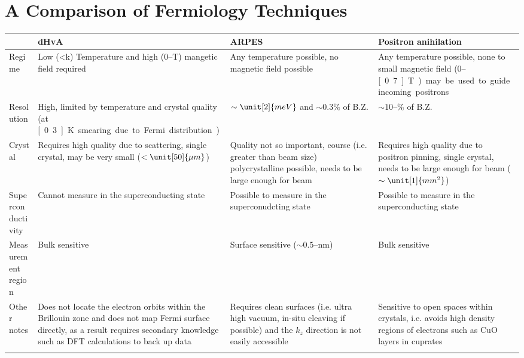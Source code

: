 \section{A Comparison of Fermiology Techniques}
\label{Appendix:FermiologyTechniques}

\begin{table}
    \begin{center}
        \begin{tabular}[htbp]{llll}
\toprule
    & \ac{dHvA} & \ac{ARPES}    & Positron anihilation \\
\midrule
Regime  & Low (<\unit[3]{k}) Temperature and high ($0$--\unit[60]{T}) mangetic field required    & Any temperature possible, no magnetic field possible   & Any temperature possible, none to small magnetic field ($0$--\unit[0.7]{T}) may be used to guide incoming positrons \\
Resolution  & High, limited by temperature and crystal quality (at \unit[0.3]{K} smearing due to Fermi distribution)& $\sim \unit[2]{meV}$ and $\sim 0.3\%$ of B.Z.  & $\sim 10$--\unit[15]{\%} of B.Z. \\
Crystal & Requires high quality due to scattering, single crystal, may be very small ($< \unit[50]{\mu m}$)   & Quality not so important, course (i.e. greater than beam size) polycrystalline possible, needs to be large enough for beam   & Requires high quality due to positron pinning, single crystal, needs to be large enough for beam ($\sim \unit[1]{mm^2}$) \\
Superconductivity   & Cannot measure in the superconducting state   & Possible to measure in the superconudcting state  & Possible to measure in the superconducting state \\
Measurement region   & Bulk sensitive    & Surface sensitive ($\sim 0.5$--\unit[10]{nm})  & Bulk sensitive \\
Other notes & Does not locate the electron orbits within the Brillouin zone and does not map Fermi surface directly, as a result requires secondary knowledge such as \ac{DFT} calculations to back up data & Requires clean surfaces (i.e. ultra high vacuum, in-situ cleaving if possible) and  the $k_z$ direction is not easily accessible  &  Sensitive to open spaces within crystals, i.e. avoids high density regions of electrons such as CuO layers in cuprates    \\
\bottomrule
        \label{Table:Appendix:FermiologyTechniques}
        \end{tabular}
    \end{center}
\end{table}

